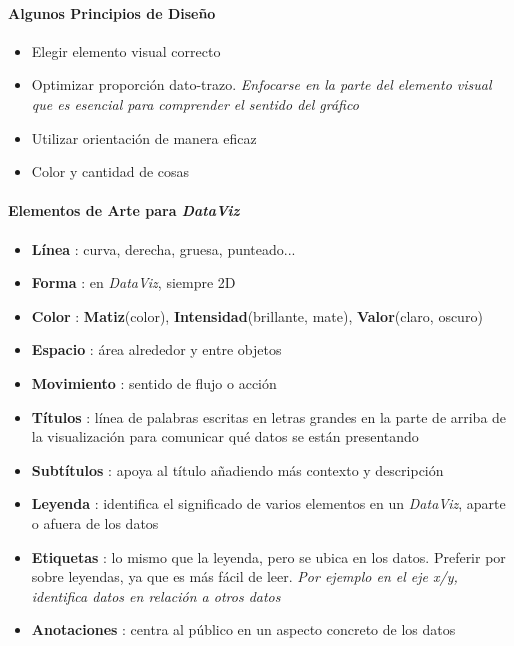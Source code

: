 \paragraph{Algunos Principios de Diseño}
\begin{itemize}
    \item {Elegir elemento visual correcto}
    \item {Optimizar proporción dato-trazo. \textit{Enfocarse en la parte del elemento visual que es esencial para comprender el sentido del gráfico}}
    \item {Utilizar orientación de manera eficaz}
    \item {Color y cantidad de cosas}
\end{itemize}

\paragraph{Elementos de Arte para \textit{DataViz}}
\begin{itemize}
    \item {\textbf{Línea} : curva, derecha, gruesa, punteado...}
    \item {\textbf{Forma} : en \textit{DataViz}, siempre 2D}
    \item {\textbf{Color} : \textbf{Matiz}(color), \textbf{Intensidad}(brillante, mate), \textbf{Valor}(claro, oscuro)}
    \item {\textbf{Espacio} : área alrededor y entre objetos}
    \item {\textbf{Movimiento} : sentido de flujo o acción}
    \item {\textbf{Títulos} : línea de palabras escritas en letras grandes en la parte de arriba de la visualización para comunicar qué datos se están presentando}
    \item {\textbf{Subtítulos} : apoya al título añadiendo más contexto y descripción}
    \item {\textbf{Leyenda} : identifica el significado de varios elementos en un \textit{DataViz}, aparte o afuera de los datos}
    \item {\textbf{Etiquetas} : lo mismo que la leyenda, pero se ubica en los datos. Preferir por sobre leyendas, ya que es más fácil de leer. \textit{Por ejemplo en el eje x/y, identifica datos en relación a otros datos}}
    \item {\textbf{Anotaciones} : centra al público en un aspecto concreto de los datos}
\end{itemize}

